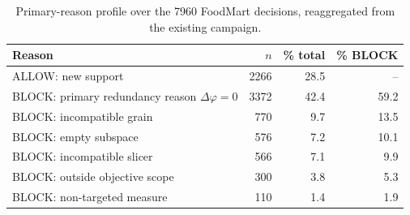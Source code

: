 \begin{table}[!tb]
\centering
\caption{Primary-reason profile over the 7960 FoodMart decisions, reaggregated from the existing campaign.}
\label{tab:campaign-a-reasons}
\scriptsize
\setlength{\tabcolsep}{2.0pt}
\renewcommand{\arraystretch}{1.07}
\begin{tabular}{@{}p{4.0cm}rrr@{}}
\toprule
Reason & $n$ & \% total & \% BLOCK \\
\midrule
ALLOW: new support & 2266 & 28.5 & -- \\
BLOCK: primary redundancy reason $\Delta\varphi=0$ & 3372 & 42.4 & 59.2 \\
BLOCK: incompatible grain & 770 & 9.7 & 13.5 \\
BLOCK: empty subspace & 576 & 7.2 & 10.1 \\
BLOCK: incompatible slicer & 566 & 7.1 & 9.9 \\
BLOCK: outside objective scope & 300 & 3.8 & 5.3 \\
BLOCK: non-targeted measure & 110 & 1.4 & 1.9 \\
\bottomrule
\end{tabular}
\normalsize
\end{table}
